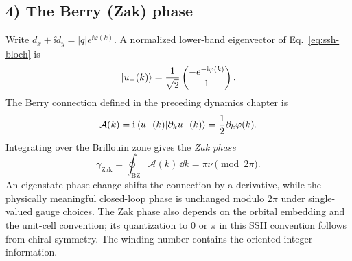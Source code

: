 
\subsection*{4) The Berry (Zak) phase}
Write $d_x+\ii d_y=|q|e^{\ii\varphi(k)}$. A normalized lower-band eigenvector of Eq.~\eqref{eq:ssh-bloch} is
\begin{equation}
\left|u_-(k)\right\rangle=\frac1{\sqrt2}\begin{pmatrix}-e^{-\mathrm{i}\varphi(k)}\\1\end{pmatrix}.
\end{equation}
The Berry connection defined in the preceding dynamics chapter is
\begin{equation}
 \mathcal A(k)=\mathrm{i}\left\langle u_-(k)\middle|\partial_k u_-(k)\right\rangle
 =\frac12\partial_k\varphi(k).
\end{equation}
Integrating over the Brillouin zone gives the \emph{Zak phase}~\cite{Zak1989}
\begin{equation}
\boxed{\gamma_{\mathrm{Zak}}=\oint_{\mathrm{BZ}}\mathcal A(k)\,\dd k
 =\pi\nu\pmod{2\pi}.}
\end{equation}
An eigenstate phase change shifts the connection by a derivative, while the physically meaningful closed-loop phase is unchanged modulo $2\pi$ under single-valued gauge choices. The Zak phase also depends on the orbital embedding and the unit-cell convention; its quantization to $0$ or $\pi$ in this SSH convention follows from chiral symmetry. The winding number contains the oriented integer information.